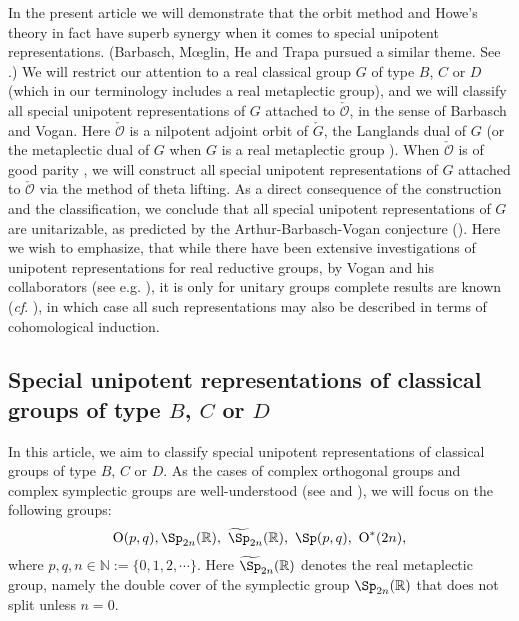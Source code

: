 \documentclass[12pt,a4paper]{amsart}
\newcommand{\BN}{{\mathbb {N}}}
\newcommand{\CO}{{\mathcal {O}}}
\newcommand{\oO}{\operatorname{O}}
\newcommand{\R}{\mathbb R}
\newcommand{\be}{\begin {equation}}
\newcommand{\ee}{\end {equation}}
\numberwithin{equation}{section}
\theoremstyle{remark}
\begin{document}
In the present article we will demonstrate that the orbit method and Howe's
theory in fact have superb synergy when it comes to special unipotent representations.
(Barbasch, M{\oe}glin, He and Trapa pursued a similar theme. See
\cite{B17,Mo17,He,Tr}.) We will restrict our attention to a real classical group
$G$ of type $B$, $C$ or $D$ (which in our terminology includes a real metaplectic group),
and we will classify all special unipotent representations of $G$ attached to $\check \CO$, in the sense of Barbasch and
Vogan. Here $\check \CO$ is a nilpotent adjoint orbit of $\check G$, the Langlands dual of $G$ (or the metaplectic dual of $G$ when $G$ is a real metaplectic group \cite{BMSZ1}).
When $\check \CO$ is of good parity \cite{MR}, we will construct all special unipotent representations of $G$ attached to $\check \CO$ via the method of theta lifting.
As a direct consequence of the construction and the classification, we conclude that all special unipotent representations of $G$ are unitarizable, as predicted by the Arthur-Barbasch-Vogan conjecture (\cite[Introduction]{ABV}). Here we wish to emphasize, that while there have
been extensive investigations of unipotent representations for real reductive
groups, by Vogan and his collaborators (see e.g. \cite{VoBook,Vo89,ABV}),
it is only for unitary groups complete results are known (\emph{cf}. \cite{BV83, Tr}), in which case all such representations may also be described in terms of cohomological induction.


\subsection{Special unipotent representations of classical groups of type $B$, $C$ or $D$}\label{secsu}
In this article, we aim to classify special unipotent representations of classical groups of type $B$, $C$ or $D$. As the cases of complex orthogonal groups  and complex symplectic groups are well-understood (see
\cite{BVUni} and \cite{B17}), we will focus on the following groups:
\be\label{typebcd}
  \oO(p,q), \Sp_{2n}(\R), \  \widetilde \Sp_{2n}(\R), \ \Sp(p,q), \  \oO^*(2n),
  \ee
  where $p,q, n\in \BN:=\{0,1,2, \cdots\}$. Here $ \widetilde \Sp_{2n}(\R)$ denotes the real metaplectic group, namely the double cover of the symplectic group  $\Sp_{2n}(\R)$ that does not split unless $n=0$.
\end{document}
